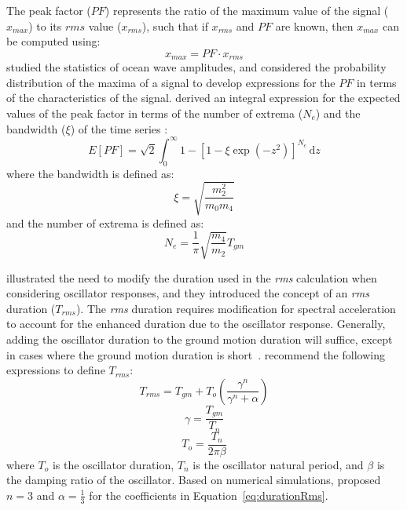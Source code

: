 \documentclass[12pt,oneside]{book}
\newcommand{\ud}{\,\mathrm{d}}
\begin{document}
The peak factor ($PF$) represents the ratio of the maximum value of the signal ($x_{max}$) to its
$rms$ value ($x_{rms}$), such that if $x_{rms}$ and $PF$ are known, then $x_{max}$ can be computed
using:
\begin{equation}
    x_{max} = PF \cdot x_{rms} %
    \label{eq:rvt:max} %
\end{equation}
\citet{cartwright:56} studied the statistics of ocean wave amplitudes, and considered the
probability distribution of the maxima of a signal to develop expressions for the $PF$ in terms of
the characteristics of the signal.  \citet{cartwright:56} derived an integral expression for the
expected values of the peak factor in terms of the number of extrema ($N_e$) and the bandwidth
($\xi$) of the time series \citep{boore:03}:
\begin{equation}
    E[PF] = \sqrt{2} \int_0^{\infty} 1 - \left[ 1 - \xi\exp\left( -z^2 \right) \right]^{N_e} \ud z
    \label{eq:rvt:peakFactor}
\end{equation}
where the bandwidth is defined as:
\begin{equation}
    \xi = \sqrt{\frac{m_2^2}{m_0 m_4}}
    \label{eq:rvt:bandWidth}
\end{equation}
and the number of extrema is defined as:
\begin{equation}
    N_e = \frac{1}{\pi} \sqrt{\frac{m_4}{m_2}} T_{gm}
    \label{eq:rvt:numExtrema}
\end{equation}

\citet{boore:84} illustrated the need to modify the duration used in the \emph{rms} calculation when
considering oscillator responses, and they introduced the concept of an \emph{rms} duration
($T_{rms}$).  The \emph{rms} duration requires modification for spectral acceleration to account for
the enhanced duration due to the oscillator response.  Generally, adding the oscillator duration to
the ground motion duration will suffice, except in cases where the ground motion duration is
short~\citep{boore:84}.  \citet{boore:84} recommend the following expressions to define $T_{rms}$:
\begin{equation}
    T_{rms} = T_{gm} + T_o \left( \frac{\gamma^n}{\gamma^n + \alpha} \right)
    \label{eq:durationRms}
\end{equation}
\begin{equation}
    \gamma = \frac{T_{gm}}{T_n}
\end{equation}
\begin{equation}
    T_o = \frac{T_n}{2\pi\beta}
\end{equation}
where $T_o$ is the oscillator duration, $T_n$ is the oscillator natural period, and $\beta$ is the
damping ratio of the oscillator.  Based on numerical simulations, \citet{boore:84} proposed $n=3$
and $\alpha=\frac{1}{3}$ for the coefficients in Equation~\ref{eq:durationRms}.
\end{document}
